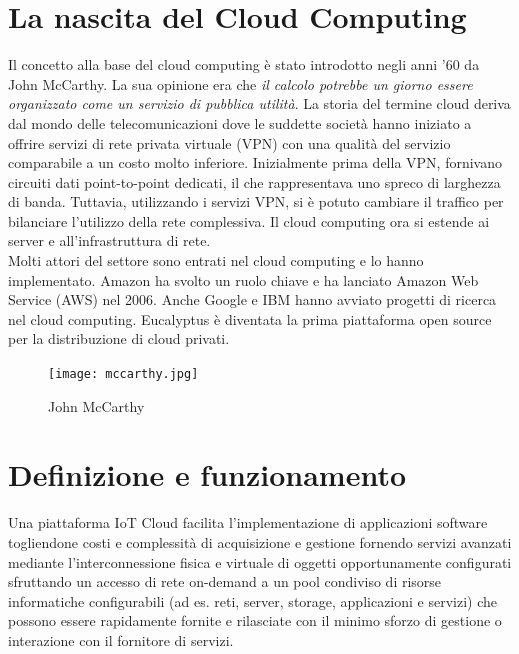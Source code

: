\documentclass[a4paper,titlepage]{report}
\begin{document}
\section{La nascita del Cloud Computing}
Il concetto alla base del cloud computing è stato introdotto negli anni '60 da John McCarthy. La sua opinione era che {\itshape il calcolo potrebbe un giorno essere organizzato come un servizio di pubblica utilità}.  La storia del termine cloud deriva dal mondo delle telecomunicazioni dove le suddette società hanno iniziato a offrire servizi di rete privata virtuale (VPN) con una qualità del servizio comparabile a un costo molto inferiore. Inizialmente prima della VPN, fornivano circuiti dati point-to-point dedicati, il che rappresentava uno spreco di larghezza di banda. Tuttavia, utilizzando i servizi VPN, si è potuto cambiare il traffico per bilanciare l'utilizzo della rete complessiva. Il cloud computing ora si estende ai server e all'infrastruttura di rete.
\\Molti attori del settore sono entrati nel cloud computing e lo hanno implementato. Amazon ha svolto un ruolo chiave e ha lanciato Amazon Web Service (AWS) nel 2006. Anche Google e IBM hanno avviato progetti di ricerca nel cloud computing. Eucalyptus è diventata la prima piattaforma open source per la distribuzione di cloud privati\cite{Jadeja:Cloudcomputingconceptsarchitectureandchallenges}.\\
\begin{figure}[h]
\centering
\texttt{[image: mccarthy.jpg]}
\caption{John McCarthy}
\end{figure}
\newpage
\section{Definizione e funzionamento}
Una piattaforma IoT Cloud facilita l'implementazione di applicazioni software togliendone costi e complessità di acquisizione e gestione fornendo servizi avanzati mediante l'interconnessione fisica e virtuale di oggetti opportunamente configurati sfruttando un accesso di rete on-demand a un pool condiviso di risorse informatiche configurabili (ad es. reti, server, storage, applicazioni e servizi) che possono essere rapidamente fornite e rilasciate con il minimo sforzo di gestione o interazione con il fornitore di servizi\cite{Ray:AsurveyofIoTcloudplatforms}.
\end{document}
